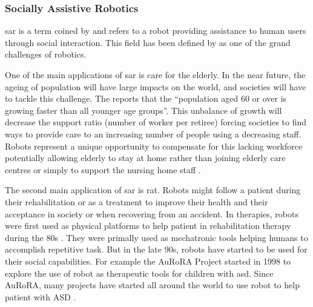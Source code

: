 \subsubsection{Socially Assistive Robotics}

	\gls{sar} is a term coined by \cite{feil2005defining} and refers to a robot providing assistance to human users through social interaction. This field has been defined by \cite{tapus2007socially} as one of the grand challenges of robotics.
	
	One of the main applications of \gls{sar} is care for the elderly. In the near future, the ageing of population will have large impacts on the world, and societies will have to tackle this challenge. The \cite{united2017world} reports that the ``population aged 60 or over is growing faster than all younger age groups''. This unbalance of growth will decrease the support ratio (number of worker per retiree) forcing societies to find ways to provide care to an increasing number of people using a decreasing staff. Robots represent a unique opportunity to compensate for this lacking workforce potentially allowing elderly to stay at home rather than joining elderly care centres \citep{di2014web} or simply to support the nursing home staff \citep{wada2004effects}.
	
	
		
	The second main application of \gls{sar} is \gls{rat}. Robots might follow a patient during their rehabilitation or as a treatment to improve their health and their acceptance in society or when recovering from an accident. In therapies, robots were first used as physical platforms to help patient in rehabilitation therapy during the 80s \citep{harwin1988robot}. They were primally used as mechatronic tools helping humans to accomplish repetitive task. But in the late 90s, robots have started to be used for their social capabilities. For example the AuRoRA Project \citep{dautenhahn1999robots} started in 1998 to explore the use of robot as therapeutic tools for children with \gls{asd}. Since AuRoRA, many projects have started all around the world to use robot to help patient with ASD \citep{diehl2012clinical,esteban2017build}. 
	
